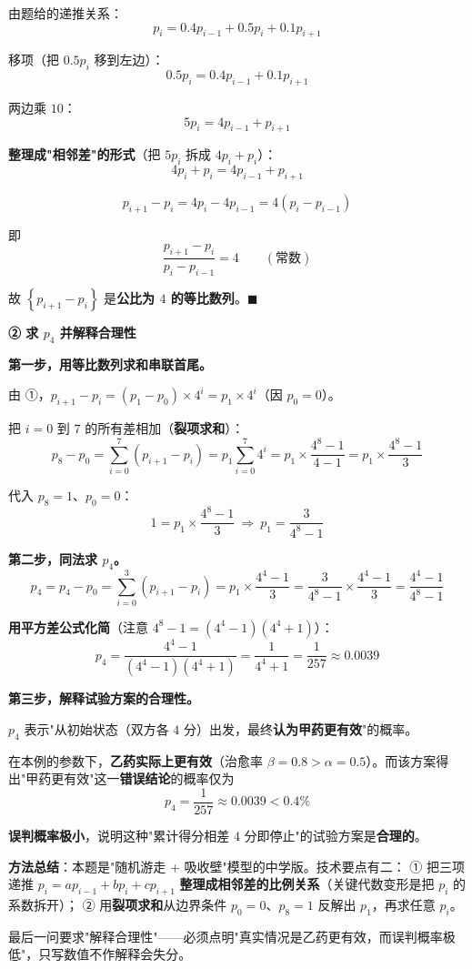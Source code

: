 由题给的递推关系：
\[p_i=0.4p_{i-1}+0.5p_i+0.1p_{i+1}\]

移项（把 $0.5p_i$ 移到左边）：
\[0.5p_i=0.4p_{i-1}+0.1p_{i+1}\]

两边乘 $10$：
\[5p_i=4p_{i-1}+p_{i+1}\]

\textbf{整理成"相邻差"的形式}（把 $5p_i$ 拆成 $4p_i+p_i$）：
\[4p_i+p_i=4p_{i-1}+p_{i+1}\]

\[p_{i+1}-p_i=4p_i-4p_{i-1}=4\left(p_i-p_{i-1}\right)\]

即
\[\frac{p_{i+1}-p_i}{p_i-p_{i-1}}=4\qquad(\text{常数})\]

故 $\left\{p_{i+1}-p_i\right\}$ 是\textbf{公比为 $4$ 的等比数列}。$\blacksquare$

\par\medskip

\textbf{② 求 $p_4$ 并解释合理性}

\textbf{第一步，用等比数列求和串联首尾。}

由 ①，$p_{i+1}-p_i=\left(p_1-p_0\right)\times4^{i}=p_1\times4^{i}$（因 $p_0=0$）。

把 $i=0$ 到 $7$ 的所有差相加（\textbf{裂项求和}）：
\[p_8-p_0=\sum_{i=0}^{7}\left(p_{i+1}-p_i\right)=p_1\sum_{i=0}^{7}4^{i}=p_1\times\frac{4^{8}-1}{4-1}=p_1\times\frac{4^{8}-1}3\]

代入 $p_8=1$、$p_0=0$：
\[1=p_1\times\frac{4^{8}-1}3\ \Longrightarrow\ p_1=\frac3{4^{8}-1}\]

\textbf{第二步，同法求 $p_4$。}
\[p_4=p_4-p_0=\sum_{i=0}^{3}\left(p_{i+1}-p_i\right)=p_1\times\frac{4^{4}-1}3=\frac3{4^{8}-1}\times\frac{4^{4}-1}3=\frac{4^{4}-1}{4^{8}-1}\]

\textbf{用平方差公式化简}（注意 $4^{8}-1=\left(4^{4}-1\right)\left(4^{4}+1\right)$）：
\[p_4=\frac{4^{4}-1}{\left(4^{4}-1\right)\left(4^{4}+1\right)}=\frac1{4^{4}+1}=\frac1{257}\approx0.0039\]

\textbf{第三步，解释试验方案的合理性。}

$p_4$ 表示"从初始状态（双方各 $4$ 分）出发，最终\textbf{认为甲药更有效}"的概率。

在本例的参数下，\textbf{乙药实际上更有效}（治愈率 $\beta=0.8>\alpha=0.5$）。而该方案得出"甲药更有效"这一\textbf{错误结论}的概率仅为
\[p_4=\frac1{257}\approx0.0039<0.4\%\]

\textbf{误判概率极小}，说明这种"累计得分相差 $4$ 分即停止"的试验方案是\textbf{合理的}。

\begin{gktip}
\textbf{方法总结}：本题是"随机游走 + 吸收壁"模型的中学版。技术要点有二：
① 把三项递推 $p_i=ap_{i-1}+bp_i+cp_{i+1}$ \textbf{整理成相邻差的比例关系}（关键代数变形是把 $p_i$ 的系数拆开）；
② 用\textbf{裂项求和}从边界条件 $p_0=0$、$p_8=1$ 反解出 $p_1$，再求任意 $p_i$。

最后一问要求"解释合理性"——必须点明"真实情况是乙药更有效，而误判概率极低"，只写数值不作解释会失分。
\end{gktip}

